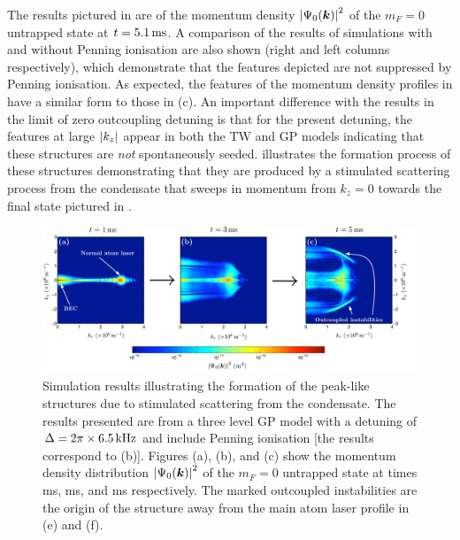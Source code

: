 The results pictured in  are of the momentum density $\left|\Psi_0(\bm{k})\right|^2$ of the $m_F=0$ untrapped state at $t=\unit[5.1]{ms}$.  A comparison of the results of simulations with and without Penning ionisation are also shown (right and left columns respectively), which demonstrate that the features depicted are not suppressed by Penning ionisation.  As expected, the features of the momentum density profiles in  have a similar form to those in (c).  An important difference with the results in the limit of zero outcoupling detuning is that for the present detuning, the features at large $\left|k_z\right|$ appear in both the TW and GP models indicating that these structures are \emph{not} spontaneously seeded.   illustrates the formation process of these structures demonstrating that they are produced by a stimulated scattering process from the condensate that sweeps in momentum from $k_z=0$ towards the final state pictured in . 

\begin{figure}
    \centering
    \includegraphics[width=20cm]{DetunedPeaksFormationProcess}
    \caption{Simulation results illustrating the formation of the peak-like structures due to stimulated scattering from the condensate. The results presented are from a three level GP model with a detuning of $\Delta = 2\pi \times \unit[6.5]{kHz}$ and include Penning ionisation [the results correspond to (b)]. Figures (a), (b), and (c) show the momentum density distribution $\left|\Psi_0(\bm{k})\right|^2$ of the $m_F=0$ untrapped state at times \unit[1]{ms}, \unit[3]{ms}, and \unit[5]{ms} respectively. The marked outcoupled instabilities are the origin of the structure away from the main atom laser profile in (e) and (f).
    \label{Peaks:DetunedPeaksFormationProcess}}
\end{figure}

